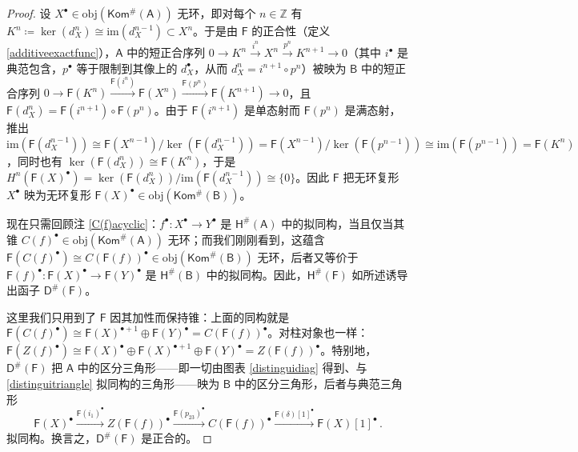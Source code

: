 \begin{proof}
	设 $X^\bullet\in\text{obj}(\mathsf{Kom^\#\!(A)})$ 无环，即对每个 $n\in\mathbb{Z}$ 有 $K^n\coloneqq\ker(d_X^n)\cong\text{im}(d_X^{n-1})\subset X^n$。于是由 $\mathsf{F}$ 的正合性（定义 \ref{additiveexactfunc}），$\mathsf{A}$ 中的短正合序列 $0\rightarrow  K^n\xrightarrow{i^n} X^n\xrightarrow{p^n} K^{n+1}\rightarrow 0$（其中 $i^\bullet$ 是典范包含，$p^\bullet$ 等于限制到其像上的 $d_X^\bullet$，从而 $d_X^n=i^{n+1}\circ p^n$）被映为 $\mathsf{B}$ 中的短正合序列 $0\rightarrow\mathsf{F}(K^n)\xrightarrow{\mathsf{F}(i^n)} \mathsf{F}(X^n)\xrightarrow{\mathsf{F}(p^n)} \mathsf{F}(K^{n+1})\rightarrow 0$，且 $\mathsf{F}(d_X^n)=\mathsf{F}(i^{n+1})\circ\mathsf{F}(p^n)$。由于 $\mathsf{F}(i^{n+1})$ 是单态射而 $\mathsf{F}(p^n)$ 是满态射，推出 $\text{im}(\mathsf{F}(d_X^{n-1}))\cong\mathsf{F}(X^{n-1})/\ker(\mathsf{F}(d_X^{n-1}))=\mathsf{F}(X^{n-1})/\ker(\mathsf{F}(p^{n-1}))\cong\text{im}(\mathsf{F}(p^{n-1}))=\mathsf{F}(K^n)$，同时也有 $\ker(\mathsf{F}(d_X^n))\cong\mathsf{F}(K^n)$，于是 $H^n(\mathsf{F}(X)^\bullet)=\ker(\mathsf{F}(d_X^n))/\text{im}(\mathsf{F}(d_X^{n-1}))\cong\{0\}$。因此 $\mathsf{F}$ 把无环复形 $X^\bullet$ 映为无环复形 $\mathsf{F}(X)^\bullet\in\text{obj}(\mathsf{Kom^\#\!(B)})$。
	
	现在只需回顾注 \ref{C(f)acyclic}：$f^\bullet:X^\bullet\rightarrow Y^\bullet$ 是 $\mathsf{H^\#\!(A)}$ 中的拟同构，当且仅当其锥 $C(f)^\bullet\in\text{obj}(\mathsf{Kom^\#\!(A)})$ 无环；而我们刚刚看到，这蕴含 $\mathsf{F}(C(f)^\bullet)\cong C(\mathsf{F}(f))^\bullet\in\text{obj}(\mathsf{Kom^\#\!(B)})$ 无环，后者又等价于 $\mathsf{F}(f)^\bullet:\mathsf{F}(X)^\bullet\rightarrow\mathsf{F}(Y)^\bullet$ 是 $\mathsf{H^\#\!(B)}$ 中的拟同构。因此，$\mathsf{H^\#\!(F)}$ 如所述诱导出函子 $\mathsf{D^\#\!(F)}$。
	
	这里我们只用到了 $\mathsf{F}$ 因其加性而保持锥：上面的同构就是 $\mathsf{F}(C(f)^\bullet)\cong\mathsf{F}(X)^{\bullet+1}\oplus\mathsf{F}(Y)^\bullet=C(\mathsf{F}(f))^\bullet$。对柱对象也一样：$\mathsf{F}(Z(f)^\bullet)\cong \mathsf{F}(X)^\bullet\oplus \mathsf{F}(X)^{\bullet+1}\oplus \mathsf{F}(Y)^\bullet=Z(\mathsf{F}(f))^\bullet$。特别地，$\mathsf{D^\#\!(F)}$ 把 $\mathsf{A}$ 中的区分三角形——即一切由图表 \eqref{distinguidiag} 得到、与 \eqref{distinguitriangle} 拟同构的三角形——映为 $\mathsf{B}$ 中的区分三角形，后者与典范三角形
	\[
	\mathsf{F}(X)^\bullet\xrightarrow{\mathsf{F}(i_1)^\bullet} Z(\mathsf{F}(f))^\bullet\xrightarrow{\mathsf{F}(p_{23})^\bullet} C(\mathsf{F}(f))^\bullet\xrightarrow{\mathsf{F}(\delta)[1]^\bullet}\mathsf{F}(X)[1]^\bullet\,.
	\] 
	拟同构。换言之，$\mathsf{D^\#\!(F)}$ 是正合的。
\end{proof}


